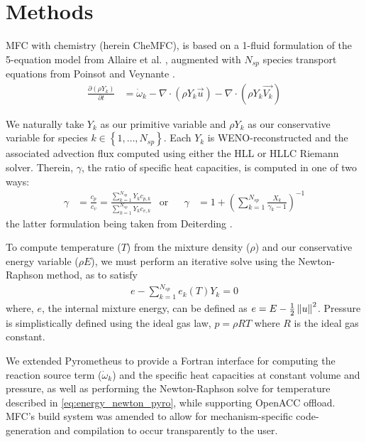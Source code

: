 \chapter{Methods}
\label{ch:methods}

MFC with chemistry (herein CheMFC), is based on a 1-fluid formulation of the 5-equation
model from Allaire et al. \cite{ALLAIRE2002577}, augmented with $N_{sp}$ species
transport equations from Poinsot and Veynante \cite{poinsot:hal-00270731}.
%
\begin{align*}
    \frac{\partial\left(\rho Y_k\right)}{\partial t} & = \dot\omega_k - \nabla \cdot (\rho Y_k \Vec{u}) - \nabla \cdot (\rho Y_k \Vec{V_k})
\end{align*}

We naturally take $Y_k$ as our primitive variable and $\rho Y_k$ as our conservative variable
for species $k \in \left\{1,\dots,N_{sp}\right\}$. Each $Y_k$ is WENO-reconstructed
and the associated advection flux computed using either the HLL or HLLC Riemann solver.
Therein, $\gamma$, the ratio of specific heat capacities, is computed in one of two ways:
%
\begin{align*}
    \gamma &= \frac{c_p}{c_v} = \frac{\sum\limits_{k=1}^{N_{sp}} Y_k c_{p,k}}{\sum\limits_{k=1}^{N_{sp}} Y_k c_{v,k}} & \text{or} & & \gamma &= 1 + \left(\sum\limits_{k=1}^{N_{sp}} \frac{X_k}{\gamma_k - 1} \right)^{-1}
\end{align*}
%
the latter formulation being taken from Deiterding \cite{soton380602}.

To compute temperature ($T$) from the mixture density ($\rho$) and our conservative energy
variable ($\rho E$), we must perform an iterative solve using the Newton-Raphson method,
as to satisfy
\begin{align}\label{eq:energy_newton_pyro}
    e - \sum\limits_{k=1}^{N_{sp}} e_k\left(T\right) Y_k = 0
\end{align}
where, $e$, the internal mixture energy, can be defined as $e = E - \frac{1}{2} \left\lVert u\right\rVert^2$.
Pressure is simplistically defined using the ideal gas law, $p = \rho R T$
where $R$ is the ideal gas constant.

We extended Pyrometheus \cite{Pyrometheus2024} to provide a Fortran interface
for computing the reaction source term ($\dot\omega_k$) and the specific heat capacities
at constant volume and pressure, as well as performing the
Newton-Raphson solve for temperature described in \autoref{eq:energy_newton_pyro},
while supporting OpenACC offload. MFC's build system was amended to allow for
mechanism-specific code-generation and compilation to occur transparently to the user.

